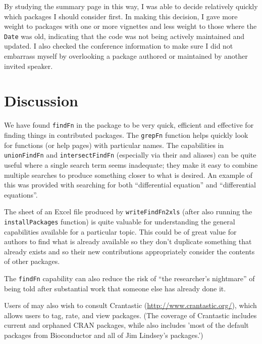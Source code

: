\documentclass[a4paper]{report}
\begin{document}
\begin{article}
By studying the summary page in this way, I was able to decide
relatively quickly which packages I should consider first.  In
making this decision, I gave more weight to packages with
one or more vignettes and less weight to those where the
{\tt Date} was old, indicating that the code was not being
actively maintained and updated.  I also checked the conference
information to make sure I did not embarrass myself by overlooking
a package authored or maintained by another invited speaker.

\section{Discussion}
We have found {\tt findFn} in the  package to
be very quick, efficient and effective for finding things in
contributed packages.  The {\tt grepFn} function helps quickly
look for functions (or help pages) with particular names.
The capabilities in {\tt unionFindFn} and {\tt intersectFindFn}
(especially via their \samp{|} and \samp{\&} aliases) can be quite useful
where a single search term seems inadequate;  they make it easy
to combine multiple searches to produce something closer to what
is desired.  An example of this was provided with searching for
both ``differential equation'' and ``differential equations''.

The  sheet of an Excel file produced by
{\tt writeFindFn2xls} (after also running the {\tt installPackages}
function) is quite valuable for understanding the
general capabilities available for a particular topic.
This could be of great value for authors to find what is already
available so they don't duplicate something that already exists
and so their new contributions appropriately consider
the contents of other packages.

The {\tt findFn} capability can also reduce the risk
of ``the researcher's nightmare'' of being told after
substantial work that someone else has already done it.

Users of  may also wish to consult Crantastic
(\url{http://www.crantastic.org/}), which allows users to tag, rate,
and view packages.  (The coverage of Crantastic includes current and
orphaned CRAN packages, while \cite{JB09URL}
also includes 'most of the default packages from Bioconductor and all
of Jim Lindsey's packages.')



\end{article}
\end{document}
